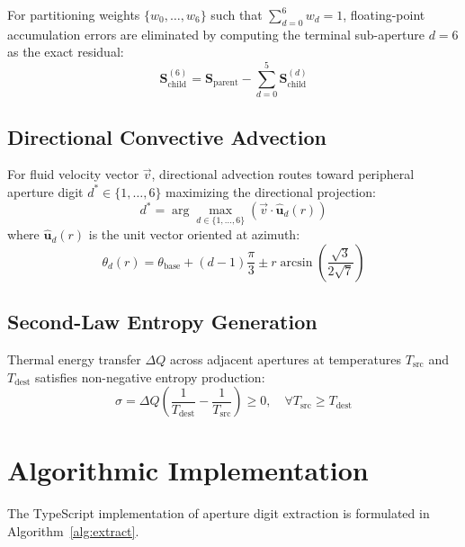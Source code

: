 \documentclass[10pt,journal,compsoc]{IEEEtran}
\begin{document}
For partitioning weights $\{w_0, \dots, w_6\}$ such that $\sum_{d=0}^{6} w_d = 1$, floating-point accumulation errors are eliminated by computing the terminal sub-aperture $d=6$ as the exact residual:
\begin{equation}
\mathbf{S}_{\text{child}}^{(6)} = \mathbf{S}_{\text{parent}} - \sum_{d=0}^{5} \mathbf{S}_{\text{child}}^{(d)}
\end{equation}

\subsection{Directional Convective Advection}
For fluid velocity vector $\vec{v}$, directional advection routes toward peripheral aperture digit $d^* \in \{1,\dots,6\}$ maximizing the directional projection:
\begin{equation}
d^* = \arg\max_{d \in \{1,\dots,6\}} \left( \vec{v} \cdot \hat{\mathbf{u}}_d(r) \right)
\end{equation}
where $\hat{\mathbf{u}}_d(r)$ is the unit vector oriented at azimuth:
\begin{equation}
\theta_d(r) = \theta_{\text{base}} + (d - 1)\frac{\pi}{3} \pm r \arcsin\left(\frac{\sqrt{3}}{2\sqrt{7}}\right)
\end{equation}

\subsection{Second-Law Entropy Generation}
Thermal energy transfer $\Delta Q$ across adjacent apertures at temperatures $T_{\text{src}}$ and $T_{\text{dest}}$ satisfies non-negative entropy production:
\begin{equation}
\sigma = \Delta Q \left( \frac{1}{T_{\text{dest}}} - \frac{1}{T_{\text{src}}} \right) \ge 0, \quad \forall T_{\text{src}} \ge T_{\text{dest}}
\end{equation}

\section{Algorithmic Implementation}

The TypeScript implementation of aperture digit extraction is formulated in Algorithm~\ref{alg:extract}.
\end{document}
